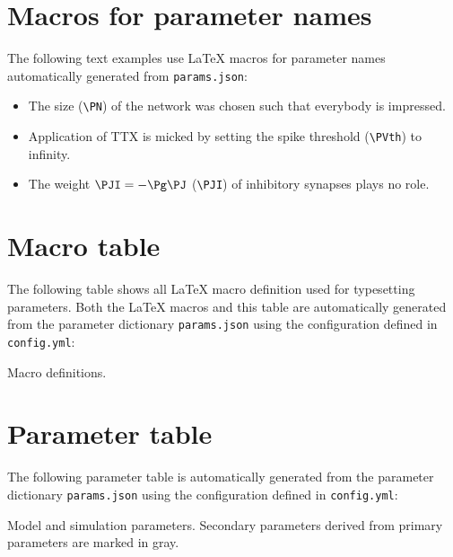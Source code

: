 \documentclass[10pt,a4paper,american]{article}
\begin{document}
\section{Macros for parameter names}


The following text examples use LaTeX macros for parameter names automatically generated from \texttt{params.json}:
\begin{itemize}
\item The size \PN (\verb+\PN+) of the network was chosen such that everybody is impressed.
\item Application of TTX is micked by setting the spike threshold \PVth (\verb+\PVth+) to infinity.
\item The weight $\PJI=-\Pg\PJ$ (\verb+\PJI+) of inhibitory synapses plays no role.
\end{itemize}

\section{Macro table}
The following table shows all LaTeX macro definition used for typesetting parameters. Both the LaTeX macros and this table are automatically generated from the parameter dictionary \texttt{params.json} using the configuration defined in \texttt{config.yml}: 
\begin{table}[ht!]
\begin{center}
  \parbox{0.8\linewidth}{       %
    \small%
    \centering%
    \renewcommand{\arraystretch}{1.2}%
    \noindent%
    \caption{Macro definitions.}
    \label{tab:macros_table}
  }
\end{center}
\end{table}

\section{Parameter table}
The following parameter table is automatically generated from the parameter dictionary \texttt{params.json} using the configuration defined in \texttt{config.yml}: 
\begin{table}[ht!]
\begin{center}
  \parbox{0.8\linewidth}{       %
    \small%
    \centering%
    \renewcommand{\arraystretch}{1.2}%
    \noindent%
    \caption{Model and simulation parameters. Secondary parameters derived from primary parameters are marked in gray.}
    \label{tab:parameter_table}
  }
\end{center}
\end{table}
\end{document}
